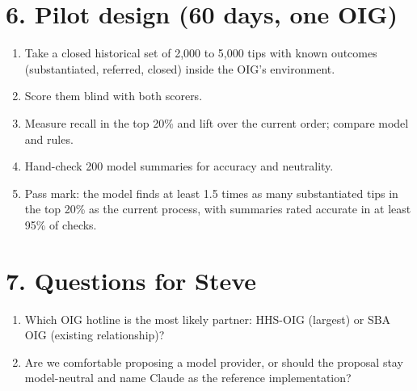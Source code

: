 \documentclass[letterpaper,11pt]{article}
\providecommand{\tightlist}{\setlength{\itemsep}{0pt}\setlength{\parskip}{0pt}}
\begin{document}
\hypertarget{pilot-design-60-days-one-oig}{%
\section*{6. Pilot design (60 days, one
OIG)}\label{pilot-design-60-days-one-oig}}

\begin{enumerate}
\def\labelenumi{\arabic{enumi}.}
\tightlist
\item
  Take a closed historical set of 2,000 to 5,000 tips with known
  outcomes (substantiated, referred, closed) inside the OIG's
  environment.
\item
  Score them blind with both scorers.
\item
  Measure recall in the top 20\% and lift over the current order;
  compare model and rules.
\item
  Hand-check 200 model summaries for accuracy and neutrality.
\item
  Pass mark: the model finds at least 1.5 times as many substantiated
  tips in the top 20\% as the current process, with summaries rated
  accurate in at least 95\% of checks.
\end{enumerate}

\hypertarget{questions-for-steve}{%
\section*{7. Questions for Steve}\label{questions-for-steve}}

\begin{enumerate}
\def\labelenumi{\arabic{enumi}.}
\tightlist
\item
  Which OIG hotline is the most likely partner: HHS-OIG (largest) or SBA
  OIG (existing relationship)?
\item
  Are we comfortable proposing a model provider, or should the proposal
  stay model-neutral and name Claude as the reference implementation?
\end{enumerate}
\end{document}
